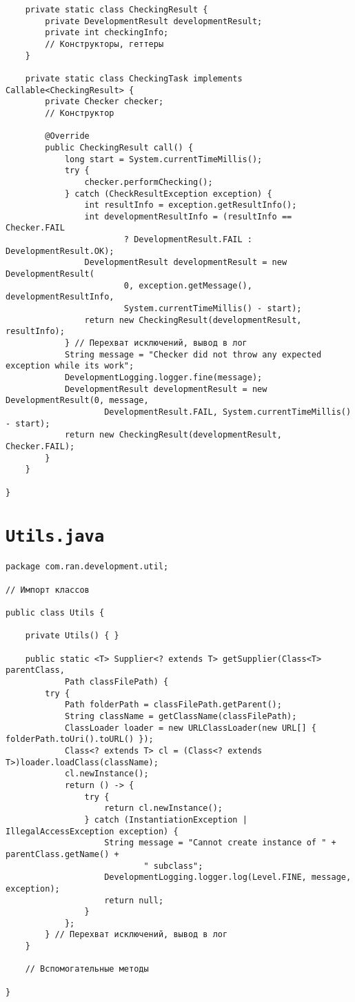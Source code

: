 \begin{verbatim}
    private static class CheckingResult {
        private DevelopmentResult developmentResult;
        private int checkingInfo;
        // Конструкторы, геттеры
    }

    private static class CheckingTask implements Callable<CheckingResult> {
        private Checker checker;
        // Конструктор

        @Override
        public CheckingResult call() {
            long start = System.currentTimeMillis();
            try {
                checker.performChecking();
            } catch (CheckResultException exception) {
                int resultInfo = exception.getResultInfo();
                int developmentResultInfo = (resultInfo == Checker.FAIL
                        ? DevelopmentResult.FAIL : DevelopmentResult.OK);
                DevelopmentResult developmentResult = new DevelopmentResult(
                        0, exception.getMessage(), developmentResultInfo,
                        System.currentTimeMillis() - start);
                return new CheckingResult(developmentResult, resultInfo);
            } // Перехват исключений, вывод в лог
            String message = "Checker did not throw any expected exception while its work";
            DevelopmentLogging.logger.fine(message);
            DevelopmentResult developmentResult = new DevelopmentResult(0, message,
                    DevelopmentResult.FAIL, System.currentTimeMillis() - start);
            return new CheckingResult(developmentResult, Checker.FAIL);
        }
    }

}
\end{verbatim}

\section*{\texttt{Utils.java}}
\begin{verbatim}
package com.ran.development.util;

// Импорт классов

public class Utils {

    private Utils() { }
    
    public static <T> Supplier<? extends T> getSupplier(Class<T> parentClass,
            Path classFilePath) {
        try {
            Path folderPath = classFilePath.getParent();
            String className = getClassName(classFilePath);
            ClassLoader loader = new URLClassLoader(new URL[] { folderPath.toUri().toURL() });
            Class<? extends T> cl = (Class<? extends T>)loader.loadClass(className);
            cl.newInstance();
            return () -> {
                try {
                    return cl.newInstance();
                } catch (InstantiationException | IllegalAccessException exception) {
                    String message = "Cannot create instance of " + parentClass.getName() +
                            " subclass";
                    DevelopmentLogging.logger.log(Level.FINE, message, exception);
                    return null;
                }
            };
        } // Перехват исключений, вывод в лог
    }
    
    // Вспомогательные методы
    
}
\end{verbatim}